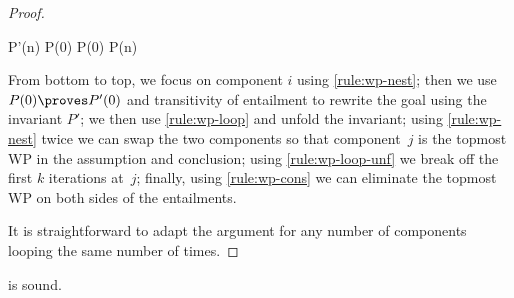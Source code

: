 \begin{proof}
\begin{derivation}
{{{{        P'(n)
      }
    }}{
      P(0) \proves
    }}{
      P(0) \proves
       {P(n)}
    }
  \end{derivation}
  From bottom to top,
    we focus on component $i$ using \ref{rule:wp-nest};
    then we use $P(0) \proves P'(0)$ and transitivity of entailment
    to rewrite the goal using the invariant $P'$;
    we then use \ref{rule:wp-loop} and unfold the invariant;
    using \ref{rule:wp-nest} twice we can swap the two components so that
    component~$j$ is the topmost WP in the assumption and conclusion;
    using \ref{rule:wp-loop-unf} we break off the first $k$ iterations at~$j$;
    finally, using \ref{rule:wp-cons} we can eliminate the topmost
    WP on both sides of the entailments.

  It is straightforward to adapt the argument for any number of components
  looping the same number of times.
\end{proof} \begin{lemma}
\label{proof:wp-rl-assign}
   is sound.
\end{lemma}

